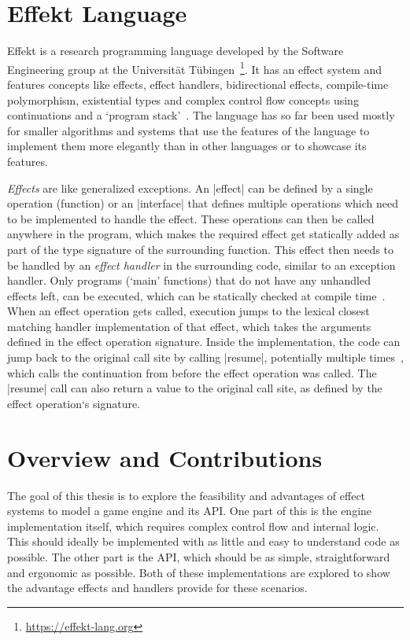 \section*{Effekt Language}

Effekt is a research programming language developed by the Software Engineering group at the Universität Tübingen~\footnote{\url{https://effekt-lang.org}}. It has an effect system and features concepts like effects, effect handlers, bidirectional effects, compile-time polymorphism, existential types and complex control flow concepts using continuations and a `program stack'~\cite{brachthauser2020effects}. The language has so far been used mostly for smaller algorithms and systems that use the features of the language to implement them more elegantly than in other languages or to showcase its features.

\textit{Effects} are like generalized exceptions. An |effect| can be defined by a single operation (function) or an |interface| that defines multiple operations which need to be implemented to handle the effect. These operations can then be called anywhere in the program, which makes the required effect get statically added as part of the type signature of the surrounding function. This effect then needs to be handled by an \textit{effect handler} in the surrounding code, similar to an exception handler. Only programs (`main' functions) that do not have any unhandled effects left, can be executed, which can be statically checked at compile time~\cite{brachthauser2022effects}. When an effect operation gets called, execution jumps to the lexical closest matching handler implementation of that effect, which takes the arguments defined in the effect operation signature. Inside the implementation, the code can jump back to the original call site by calling |resume|, potentially multiple times~\cite{muhcu2025multipleresumptions}, which calls the continuation from before the effect operation was called. The |resume| call can also return a value to the original call site, as defined by the effect operation`s signature.

\section*{Overview and Contributions}

The goal of this thesis is to explore the feasibility and advantages of effect systems to model a game engine and its API. One part of this is the engine implementation itself, which requires complex control flow and internal logic. This should ideally be implemented with as little and easy to understand code as possible. The other part is the API, which should be as simple, straightforward and ergonomic as possible. Both of these implementations are explored to show the advantage effects and handlers provide for these scenarios.

